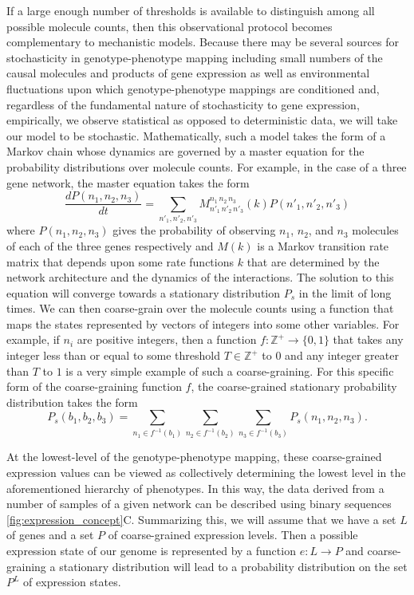 If a large enough number of thresholds is available to distinguish among all possible molecule counts, then this observational protocol becomes complementary to mechanistic models.  Because there may be several sources for stochasticity in genotype-phenotype mapping including small numbers of the causal molecules and products of gene expression as well as environmental fluctuations upon which genotype-phenotype mappings are conditioned \cite{Swain2002,Paulsson2004,Thattai2004,Acar2008a,Lestas2010,Munsky2012,Chalancon2012,Neuert2013,Sanchez2013}and, regardless of the fundamental nature of stochasticity to gene expression, empirically, we observe statistical as opposed to deterministic data, we will take our model to be stochastic.  Mathematically, such a model takes the form of a Markov chain whose dynamics are governed by a master equation for the probability distributions over molecule counts.   For example, in the case of a three gene network, the master equation takes the form
$$
\frac{dP(n_1,n_2,n_3)}{dt} = \sum_{n'_1,n'_2,n'_3} M^{n_1\,n_2\,n_3}_{n'_1\,n'_2\,n'_3}(k) P(n'_1,n'_2,n'_3)
$$
where $P(n_1,n_2,n_3)$ gives the probability of observing $n_1$, $n_2$, and $n_3$ molecules of each of the three genes respectively and $M(k)$ is a Markov transition rate matrix that depends upon some rate functions $k$ that are determined by the network architecture and the dynamics of the interactions.  The solution to this equation will converge towards  a stationary distribution $P_s$ in the limit of long times. We can then coarse-grain over the molecule counts using a function that maps the states represented by vectors of integers into some other variables. For example, if $n_i$ are positive integers, then a function $f \colon \mathbb{Z}^+ \rightarrow \{0,1\}$ that takes any integer less than or equal to some threshold $T \in \mathbb{Z}^+$ to $0$ and any integer greater than $T$ to $1$ is a very simple example of such a coarse-graining. For this specific form of the coarse-graining function $f$, the coarse-grained stationary probability distribution takes the form
$$
P_s(b_1,b_2,b_3) = \sum_{n_1 \in f^{-1}(b_1)}\sum_{n_2 \in f^{-1}(b_2)}\sum_{n_3 \in f^{-1}(b_3)} P_s(n_1,n_2,n_3).
$$

At the lowest-level of the genotype-phenotype mapping, these coarse-grained expression values can be viewed as collectively determining the lowest level in the aforementioned hierarchy of phenotypes. In this way, the data derived from a number of samples of a given network can be described using binary sequences \ref{fig:expression_concept}C.  Summarizing this, we will assume that we have a set $L$ of genes and a set $P$ of coarse-grained expression levels.  Then a possible expression state of our genome is represented by a function $e : L \to P$ and coarse-graining a stationary distribution will lead to a probability distribution on the set $P^L$ of expression states.

